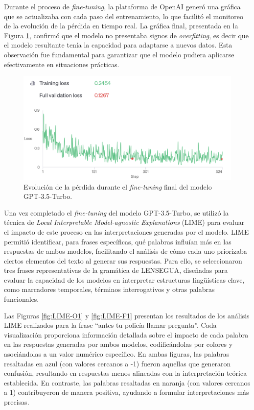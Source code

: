 Durante el proceso de \textit{fine-tuning}, la plataforma de OpenAI generó una gráfica que se actualizaba con cada paso del entrenamiento, lo que facilitó el monitoreo de la evolución de la pérdida en tiempo real. La gráfica final, presentada en la Figura \ref{fig:LOSS}, confirmó que el modelo no presentaba signos de \textit{overfitting}, es decir que el modelo resultante tenía la capacidad para adaptarse a nuevos datos. Esta observación fue fundamental para garantizar que el modelo pudiera aplicarse efectivamente en situaciones prácticas.

\begin{figure}[H]
\centering
\includegraphics[width=0.75\linewidth]{figuras/LOSS.png}
\caption{Evolución de la pérdida durante el \textit{fine-tuning} final del modelo GPT-3.5-Turbo.}
\label{fig:LOSS}
\end{figure}

Una vez completado el \textit{fine-tuning} del modelo GPT-3.5-Turbo, se utilizó la técnica de \textit{Local Interpretable Model-agnostic Explanations} (LIME) para evaluar el impacto de este proceso en las interpretaciones generadas por el modelo. LIME permitió identificar, para frases específicas, qué palabras influían más en las respuestas de ambos modelos, facilitando el análisis de cómo cada uno priorizaba ciertos elementos del texto al generar sus respuestas. Para ello, se seleccionaron tres frases representativas de la gramática de LENSEGUA, diseñadas para evaluar la capacidad de los modelos en interpretar estructuras lingüísticas clave, como marcadores temporales, términos interrogativos y otras palabras funcionales.

Las Figuras \ref{fig:LIME-O1} y \ref{fig:LIME-F1} presentan los resultados de los análisis LIME realizados para la frase “antes tu policía llamar pregunta”. Cada visualización proporciona información detallada sobre el impacto de cada palabra en las respuestas generadas por ambos modelos, codificándolas por colores y asociándolas a un valor numérico específico. En ambas figuras, las palabras resaltadas en azul (con valores cercanos a -1) fueron aquellas que generaron confusión, resultando en respuestas menos alineadas con la interpretación teórica establecida. En contraste, las palabras resaltadas en naranja (con valores cercanos a 1) contribuyeron de manera positiva, ayudando a formular interpretaciones más precisas.

